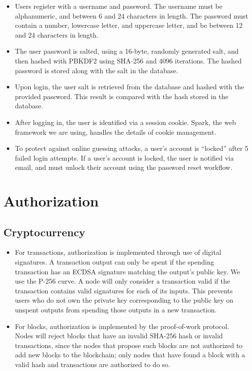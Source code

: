 \documentclass[a4paper,12pt]{article}
\begin{document}
\begin{itemize}
\item Users register with a username and password. The username must be alphanumeric, and between 6 and 24 characters in length.
The password must contain a number, lowercase letter, and uppercase letter, and be between 12 and 24 characters in length.
\item The user password is salted, using a 16-byte, randomly generated salt, and then hashed with PBKDF2 using SHA-256 and 4096 iterations.
The hashed password is stored along with the salt in the database.
\item Upon login, the user salt is retrieved from the database and hashed with the provided password.
This result is compared with the hash stored in the database.
\item After logging in, the user is identified via a session cookie.
Spark, the web framework we are using, handles the details of cookie management.
\item To protect against online guessing attacks, a user's account is ``locked'' after 5 failed login attempts.
If a user's account is locked, the user is notified via email, and must unlock their account using the password reset workflow.
\end{itemize}


\section{Authorization}
\subsection{Cryptocurrency}
\begin{itemize}
\item For transactions, authorization is implemented through use of digital signatures.
A transaction output can only be spent if the spending transaction has an ECDSA signature matching the output's public key.
We use the P-256 curve.
A node will only consider a transaction valid if the transaction contains valid signatures for each of its inputs.
This prevents users who do not own the private key corresponding to the public key on unspent outputs from spending those outputs in a new transaction.
\item For blocks, authorization is implemented by the proof-of-work protocol.
Nodes will reject blocks that have an invalid SHA-256 hash or invalid transactions, since the nodes that propose such blocks are not authorized to add new blocks to the blockchain; only nodes that have found a block with a valid hash and transactions are authorized to do so.
\end{itemize}
\end{document}
